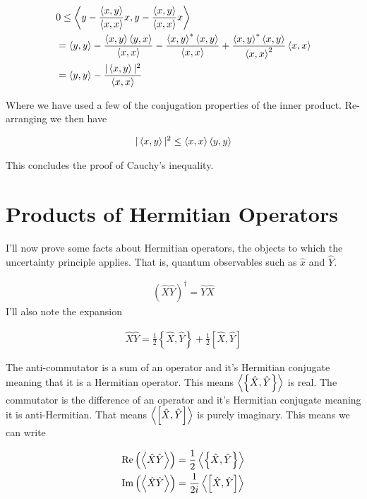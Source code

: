 \documentclass[12pt]{article}
\begin{document}
\begin{align}
&0 \le \Braket{y - \frac{\Braket{x,y}}{\Braket{x,x}}x,y - \frac{\Braket{x,y}}{\Braket{x,x}}x}\\
&=\Braket{y,y} - \frac{\Braket{x,y}\Braket{y,x}}{\Braket{x,x}} - \frac{\braket{x,y}^*\Braket{x,y}}{\Braket{x,x}} + \frac{\Braket{x,y}^*\Braket{x,y}}{\Braket{x,x}^2} \Braket{x,x}\\
&=\Braket{y,y} - \frac{|\Braket{x,y}|^2}{\Braket{x,x}}
\end{align}

Where we have used a few of the conjugation properties of the inner product. Re-arranging we then have

\begin{align}
|\Braket{x,y}|^2 \le \Braket{x,x}\Braket{y,y}
\end{align}

This concludes the proof of Cauchy's inequality.

\section{Products of Hermitian Operators}

I'll now prove some facts about Hermitian operators, the objects to which the uncertainty principle applies. That is, quantum observables such as $\hat{x}$ and $\hat{Y}$.

\begin{align}
\left(\hat{X}\hat{Y}\right)^{\dag} = \hat{Y}\hat{X}
\end{align}
I'll also note the expansion

\begin{align}
\hat{X}\hat{Y} = \frac{1}{2}\left\{\hat{X},\hat{Y}\right\} + \frac{1}{2}\left[\hat{X},\hat{Y}\right]
\end{align}

The anti-commutator is a sum of an operator and it's Hermitian conjugate meaning that it is a Hermitian operator. This means $\Braket{\left\{\hat{X},\hat{Y}\right\}}$ is real. The commutator is the difference of an operator and it's Hermitian conjugate meaning it is anti-Hermitian. That means $\Braket{\left[\hat{X},\hat{Y}\right]}$ is purely imaginary. This means we can write

\begin{align}
&\text{Re}\left(\Braket{\hat{X}\hat{Y}}\right) = \frac{1}{2}\Braket{\left\{\hat{X},\hat{Y}\right\}}\\
&\text{Im}\left(\Braket{\hat{X}\hat{Y}}\right) = \frac{1}{2i}\Braket{\left[\hat{X},\hat{Y}\right]}
\end{align}
\end{document}
